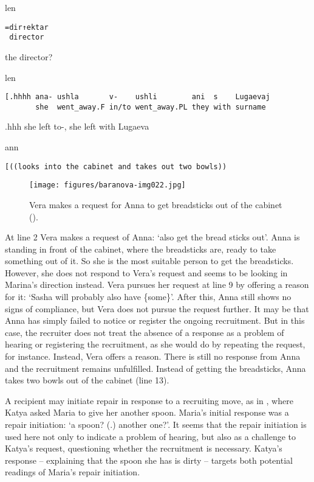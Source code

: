 \documentclass[output=paper,modfonts,nonflat]{langsci/langscibook}
\begin{document}
%
\begin{transbox}{10}{len}%
\begin{verbatim}
=dir↑ektar
 director
\end{verbatim}
\hspace{0.07cm} the director?
\end{transbox}
%
%
\begin{transbox}{12}{len}
\begin{verbatim}
[.hhhh ana- ushla       v-    ushli        ani  s    Lugaevaj
       she  went_away.F in/to went_away.PL they with surname
\end{verbatim}
\hspace{0.07cm} .hhh she left to-, she left with Lugaeva
\end{transbox}
%
\begin{transbox}{13}{ann}%
\begin{verbatim}
[((looks into the cabinet and takes out two bowls))
\end{verbatim}
\end{transbox}\bigskip

\begin{figure}
\texttt{[image: figures/baranova-img022.jpg]}
\caption{Vera makes a request for Anna to get breadsticks out of the cabinet ().}
\label{fig:baranova:22}
\end{figure}

At line 2 Vera makes a request of Anna: ‘also get the bread sticks out’. Anna is standing in front of the cabinet, where the breadsticks are, ready to take something out of it. So she is the most suitable person to get the breadsticks. However, she does not respond to Vera's request and seems to be looking in Marina's direction instead. Vera pursues her request at line 9 by offering a reason for it: ‘Sasha will probably also have \{some\}’. After this, Anna still shows no signs of compliance, but Vera does not pursue the request further. It may be that Anna has simply failed to notice or register the ongoing recruitment. But in this case, the recruiter does not treat the absence of a response as a problem of hearing or registering the recruitment, as she would do by repeating the request, for instance. Instead, Vera offers a reason. There is still no response from Anna and the recruitment remains unfulfilled. Instead of getting the breadsticks, Anna takes two bowls out of the cabinet (line 13).

A recipient may initiate repair in response to a recruiting move, as in , where Katya asked Maria to give her another spoon. Maria’s initial response was a repair initiation: ‘a spoon? (.) another one?’. It seems that the repair initiation is used here not only to indicate a problem of hearing, but also as a challenge to Katya’s request, questioning whether the recruitment is necessary. Katya’s response -- explaining that the spoon she has is dirty -- targets both potential readings of Maria’s repair initiation.
\end{document}
